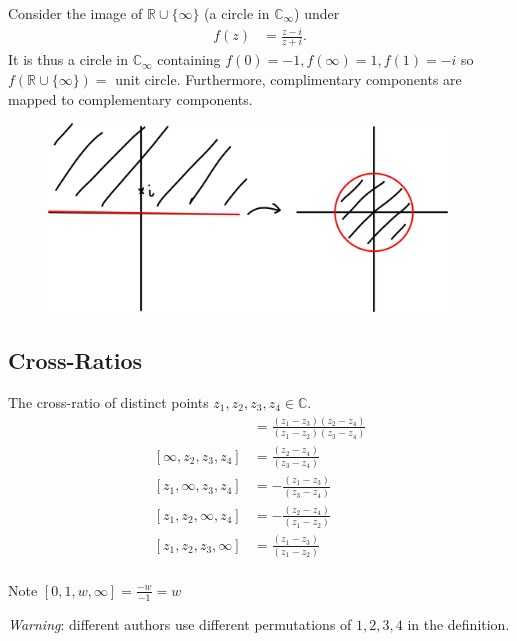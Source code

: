 \begin{example}
    Consider the image of $\mathbb{R} \cup \{\infty\}$ (a circle in $\mathbb{C}_\infty$) under 
    \begin{align*}
        f(z) &= \frac{z - i}{z + i}.
    \end{align*} 
    It is thus a circle in $\mathbb{C}_\infty$ containing $f(0) = -1, f(\infty) = 1, f(1) = -i$ so $f(\mathbb{R} \cup \{\infty\}) = $ unit circle. 
    Furthermore, complimentary components are mapped to complementary components.
    \begin{figure}[h] 
        \centering 
        \includegraphics[height=5cm]{figures/08-complimentary} 
    \end{figure}
\end{example} 

\subsection{Cross-Ratios}

\begin{definition} \label{def:23}
    The cross-ratio of distinct points $z_1, z_2, z_3, z_4 \in \mathbb{C}$.
    \begin{align*}
        [z_1, z_2, z_3, z_4] &= \frac{(z_1 - z_3)(z_2 - z_4)}{(z_1 - z_2)(z_3 - z_4)} \\
        [\infty, z_2, z_3, z_4] &= \frac{(z_2 - z_4)}{(z_3 - z_4)} \\
        [z_1, \infty, z_3, z_4] &= -\frac{(z_1 - z_3)}{(z_3 - z_4)} \\
        [z_1, z_2, \infty, z_4] &= -\frac{(z_2 - z_4)}{(z_1 - z_2)} \\
        [z_1, z_2, z_3, \infty] &= \frac{(z_1 - z_3)}{(z_1 - z_2)} \\
    \end{align*} 
\end{definition} 

Note $[0, 1, w, \infty] = \frac{-w}{-1} = w$

\emph{Warning}: different authors use different permutations of $1, 2, 3, 4$ in the definition.

